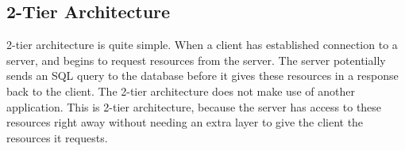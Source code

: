 \subsection{2-Tier Architecture}

2-tier architecture is quite simple. When a client has established connection to a server, 
and begins to request resources from the server. The server potentially sends an SQL query 
to the database before it gives these resources in a response back to the client. The 2-tier 
architecture does not make use of another application. This is 2-tier architecture, because 
the server has access to these resources right away without needing an extra layer to give 
the client the resources it requests\cite{tierserverclient08}.